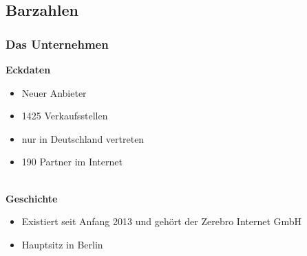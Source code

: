 \subsection{Barzahlen}
\subsubsection{Das Unternehmen}

\textbf{Eckdaten}\\
\begin{itemize}
\item Neuer Anbieter
\item 1425 Verkaufsstellen
\item nur in Deutschland vertreten
\item 190 Partner im Internet
\end{itemize}
\\
%
%
\textbf{Geschichte}\\
\begin{itemize}
\item Existiert seit Anfang 2013 und gehört der Zerebro Internet GmbH
\item Hauptsitz in Berlin
\end{itemize}
